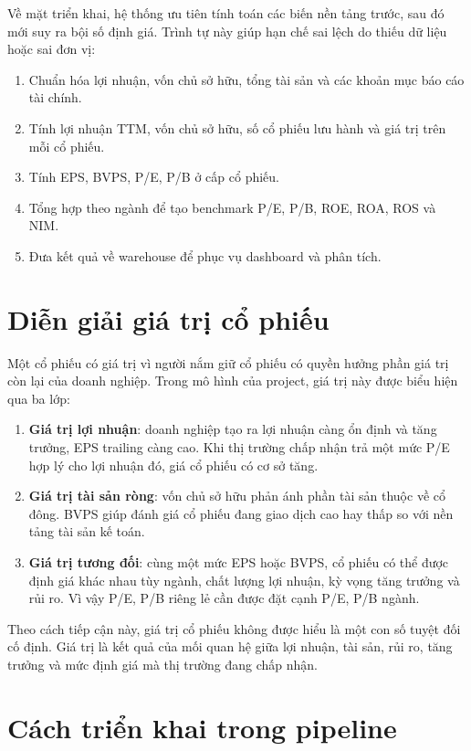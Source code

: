 \documentclass[12pt,a4paper]{article}
\begin{document}
Về mặt triển khai, hệ thống ưu tiên tính toán các biến nền tảng trước, sau đó mới suy ra bội số định giá. Trình tự này giúp hạn chế sai lệch do thiếu dữ liệu hoặc sai đơn vị:

\begin{enumerate}
    \item Chuẩn hóa lợi nhuận, vốn chủ sở hữu, tổng tài sản và các khoản mục báo cáo tài chính.
    \item Tính lợi nhuận TTM, vốn chủ sở hữu, số cổ phiếu lưu hành và giá trị trên mỗi cổ phiếu.
    \item Tính EPS, BVPS, P/E, P/B ở cấp cổ phiếu.
    \item Tổng hợp theo ngành để tạo benchmark P/E, P/B, ROE, ROA, ROS và NIM.
    \item Đưa kết quả về warehouse để phục vụ dashboard và phân tích.
\end{enumerate}

\section{Diễn giải giá trị cổ phiếu}

Một cổ phiếu có giá trị vì người nắm giữ cổ phiếu có quyền hưởng phần giá trị còn lại của doanh nghiệp. Trong mô hình của project, giá trị này được biểu hiện qua ba lớp:

\begin{enumerate}
    \item \textbf{Giá trị lợi nhuận}: doanh nghiệp tạo ra lợi nhuận càng ổn định và tăng trưởng, EPS trailing càng cao. Khi thị trường chấp nhận trả một mức P/E hợp lý cho lợi nhuận đó, giá cổ phiếu có cơ sở tăng.
    \item \textbf{Giá trị tài sản ròng}: vốn chủ sở hữu phản ánh phần tài sản thuộc về cổ đông. BVPS giúp đánh giá cổ phiếu đang giao dịch cao hay thấp so với nền tảng tài sản kế toán.
    \item \textbf{Giá trị tương đối}: cùng một mức EPS hoặc BVPS, cổ phiếu có thể được định giá khác nhau tùy ngành, chất lượng lợi nhuận, kỳ vọng tăng trưởng và rủi ro. Vì vậy P/E, P/B riêng lẻ cần được đặt cạnh P/E, P/B ngành.
\end{enumerate}

Theo cách tiếp cận này, giá trị cổ phiếu không được hiểu là một con số tuyệt đối cố định. Giá trị là kết quả của mối quan hệ giữa lợi nhuận, tài sản, rủi ro, tăng trưởng và mức định giá mà thị trường đang chấp nhận.

\section{Cách triển khai trong pipeline}
\end{document}
